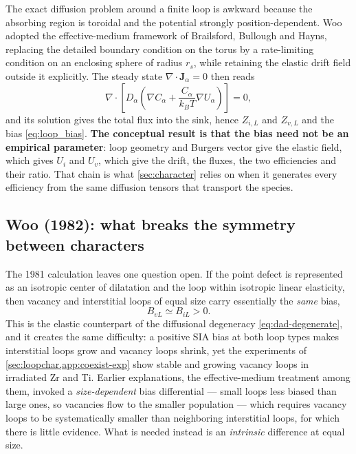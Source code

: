 \documentclass{article}
\begin{document}
The exact diffusion problem around a finite loop is awkward because the absorbing
region is toroidal and the potential strongly position-dependent. Woo adopted the
effective-medium framework of Brailsford, Bullough and Hayns, replacing the
detailed boundary condition on the torus by a rate-limiting condition on an
enclosing sphere of radius $r_s$, while retaining the elastic drift field outside
it explicitly. The steady state $\nabla\!\cdot\!\bm J_\alpha=0$ then reads
\begin{equation}
    \nabla\cdot\left[D_{\alpha}\left(\nabla C_{\alpha}
       +\frac{C_{\alpha}}{k_BT}\nabla U_{\alpha}\right)\right]=0 ,
    \label{eq:woo_diffusion}
\end{equation}
and its solution gives the total flux into the sink, hence $Z_{i,L}$ and
$Z_{v,L}$ and the bias \cref{eq:loop_bias}. \textbf{The conceptual result is that
the bias need not be an empirical parameter}: loop geometry and Burgers vector
give the elastic field, which gives $U_i$ and $U_v$, which give the drift, the
fluxes, the two efficiencies and their ratio. That chain is what
\cref{sec:character} relies on when it generates every efficiency from the same
diffusion tensors that transport the species.

\subsection{Woo (1982): what breaks the symmetry between characters}

The 1981 calculation leaves one question open. If the point defect is represented
as an isotropic center of dilatation and the loop within isotropic linear
elasticity, then vacancy and interstitial loops of equal size carry essentially
the \emph{same} bias,
\begin{equation}
    B_{vL}\simeq B_{iL}>0 .
    \label{eq:iso_degenerate}
\end{equation}
This is the elastic counterpart of the diffusional degeneracy
\cref{eq:dad-degenerate}, and it creates the same difficulty: a positive SIA bias
at both loop types makes interstitial loops grow and vacancy loops shrink, yet
the experiments of \cref{sec:loopchar,app:coexist-exp} show stable and growing
vacancy loops in irradiated Zr and Ti. Earlier explanations, the effective-medium
treatment among them, invoked a \emph{size-dependent} bias differential --- small
loops less biased than large ones, so vacancies flow to the smaller population
--- which requires vacancy loops to be systematically smaller than neighboring
interstitial loops, for which there is little evidence. What is needed instead is
an \emph{intrinsic} difference at equal size.
\end{document}
